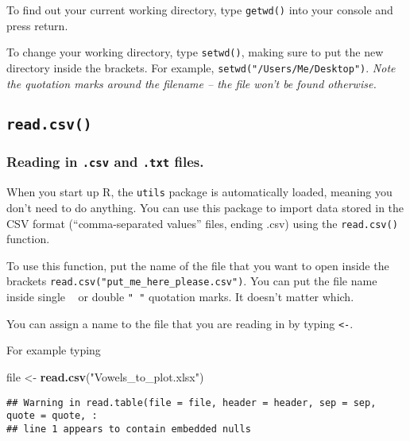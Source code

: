 \documentclass[
]{article}
\newenvironment{Shaded}{\begin{snugshade}}{\end{snugshade}}
\newcommand{\FunctionTok}[1]{\textcolor[rgb]{0.13,0.29,0.53}{\textbf{#1}}}
\newcommand{\NormalTok}[1]{#1}
\newcommand{\OtherTok}[1]{\textcolor[rgb]{0.56,0.35,0.01}{#1}}
\newcommand{\StringTok}[1]{\textcolor[rgb]{0.31,0.60,0.02}{#1}}
\begin{document}
To find out your current working directory, type \texttt{getwd()} into
your console and press return.

To change your working directory, type \texttt{setwd()}, making sure to
put the new directory inside the brackets. For example,
\texttt{setwd("/Users/Me/Desktop")}. \emph{Note the quotation marks
around the filename -- the file won't be found otherwise.}

\n
\n

\hypertarget{read.csv}{%
\subsection{\texorpdfstring{\texttt{read.csv()}}{read.csv()}}\label{read.csv}}

\hypertarget{reading-in-.csv-and-.txt-files.}{%
\subsubsection{\texorpdfstring{Reading in \texttt{.csv} and
\texttt{.txt}
files.}{Reading in .csv and .txt files.}}\label{reading-in-.csv-and-.txt-files.}}

When you start up R, the \texttt{utils} package is automatically loaded,
meaning you don't need to do anything. You can use this package to
import data stored in the CSV format (``comma-separated values'' files,
ending .csv) using the \texttt{read.csv()} function.

To use this function, put the name of the file that you want to open
inside the brackets \texttt{read.csv("put\_me\_here\_please.csv")}. You
can put the file name inside single
\texttt{\textquotesingle{}\ \textquotesingle{}} or double \texttt{"\ "}
quotation marks. It doesn't matter which.

You can assign a name to the file that you are reading in by typing
\texttt{\textless{}-}.

For example typing

\begin{Shaded}
\begin{Highlighting}[]
\NormalTok{file }\OtherTok{\textless{}{-}} \FunctionTok{read.csv}\NormalTok{(}\StringTok{"Vowels\_to\_plot.xlsx"}\NormalTok{)}
\end{Highlighting}
\end{Shaded}

\begin{verbatim}
## Warning in read.table(file = file, header = header, sep = sep, quote = quote, :
## line 1 appears to contain embedded nulls
\end{verbatim}
\end{document}
